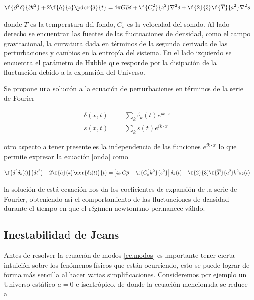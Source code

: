 \begin{equation}
\f{\partial^2\delta}{\partial t^2}+2\f{\dot{a}}{a}\pder{\delta}{t} =
4\pi G \overline{\rho}\delta + \f{C_s^2}{a^2}\nabla^2\delta+\f{2}{3}\f{\overline{T}}{a^2}\nabla^2s
\label{onda}
\end{equation}

donde $\overline{T}$ es la temperatura del fondo, $C_s$ es la velocidad del sonido. 
Al lado derecho se encuentran las fuentes de las 
fluctuaciones de densidad, como el campo gravitacional, la curvatura dada en términos de la segunda 
derivada de las perturbaciones y cambios en la entropía del sistema. En el lado izquierdo 
se encuentra el parámetro de Hubble que responde por la disipación de la fluctuación debido 
a la expansión del Universo. 

Se propone una solución a la ecuación de perturbaciones en términos de la serie de Fourier 

\begin{eqnarray}
\delta(x,t) &=& \sum_k \delta_k(t)e^{ik\cdot x} \nonumber\\
s(x,t) &=& \sum_k s(t)e^{ik\cdot x} \nonumber
\end{eqnarray}

otro aspecto a tener presente es la independencia de las funciones $e^{ik\cdot x}$ lo que permite expresar 
la ecuación \ref{onda} como

\begin{equation}
\f{d^2\delta_k(t)}{dt^2}+2\f{\dot{a}}{a}\der{\delta_k(t)}{t} = 
\left[4\pi G\overline{\rho}-\f{C_s^2 k^2}{a^2}\right]\delta_k(t)
-\f{2}{3}\f{\overline{T}}{a^2}k^2s_k(t)
\label{ec.modos}
\end{equation}

la solución de está ecuación nos da los coeficientes de expansión de la serie de 
Fourier, obteniendo así el comportamiento de las fluctuaciones de densidad durante
el tiempo en que el régimen newtoniano permanece válido. 

\subsection{Inestabilidad de Jeans}

Antes de resolver la ecuación de modos \ref{ec.modos} es importante tener cierta
intuición sobre los fenómenos físicos que están ocurriendo, esto se puede lograr
de forma más sencilla al hacer varias simplificaciones. Consideremos por ejemplo
un Universo estático $\dot{a}=0$ e isentrópico, de donde la ecuación mencionada 
se reduce a 

